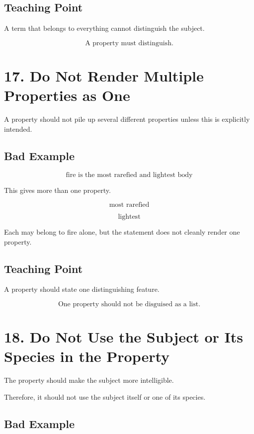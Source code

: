 \documentclass[12pt]{article}
\begin{document}
\subsection*{Teaching Point}

A term that belongs to everything cannot distinguish the subject.

\[
\boxed{
\text{A property must distinguish.}
}
\]

\section*{17. Do Not Render Multiple Properties as One}

A property should not pile up several different properties unless this is
explicitly intended.

\subsection*{Bad Example}

\[
\text{fire is the most rarefied and lightest body}
\]

This gives more than one property.

\[
\text{most rarefied}
\]

\[
\text{lightest}
\]

Each may belong to fire alone, but the statement does not cleanly render one
property.

\subsection*{Teaching Point}

A property should state one distinguishing feature.

\[
\boxed{
\text{One property should not be disguised as a list.}
}
\]

\section*{18. Do Not Use the Subject or Its Species in the Property}

The property should make the subject more intelligible.

Therefore, it should not use the subject itself or one of its species.

\subsection*{Bad Example}
\end{document}
